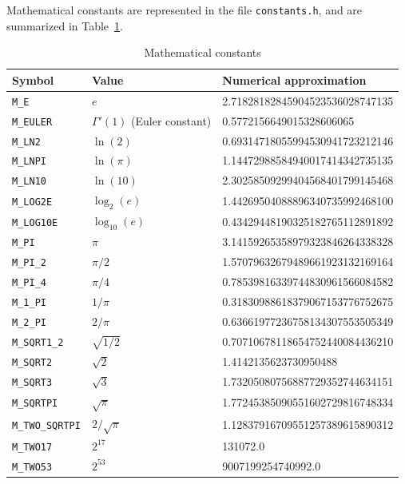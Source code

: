 Mathematical constants are represented in the file \verb|constants.h|,
and are summarized in Table~\ref{tab:constants}.
\begin{table}[htb]
\begin{small}
\begin{tabularx}{\textwidth}{lll}
Symbol & Value & Numerical approximation \\
\hline
\verb|M_E| & $e$ & 2.71828182845904523536028747135 \\
\verb|M_EULER| & $\Gamma'(1)$ (Euler constant\index{Euler constant})&
0.5772156649015328606065 \\
\verb|M_LN2| & $\ln(2)$ & 0.69314718055994530941723212146 \\
\verb|M_LNPI| & $\ln(\pi)$ & 1.14472988584940017414342735135 \\
\verb|M_LN10| & $\ln(10)$ & 2.30258509299404568401799145468 \\
\verb|M_LOG2E| & $\log_2(e)$ & 1.44269504088896340735992468100 \\
\verb|M_LOG10E| & $\log_{10} (e)$ & 0.43429448190325182765112891892 \\
\verb|M_PI| & $\pi$ & 3.14159265358979323846264338328 \\
\verb|M_PI_2| & $\pi/2$ & 1.57079632679489661923132169164 \\
\verb|M_PI_4| & $\pi/4$ & 0.78539816339744830961566084582 \\
\verb|M_1_PI| & $1/\pi$ & 0.31830988618379067153776752675 \\
\verb|M_2_PI| & $2/\pi$ & 0.63661977236758134307553505349 \\
\verb|M_SQRT1_2| & $\sqrt{1/2}$ & 0.70710678118654752440084436210 \\
\verb|M_SQRT2| & $\sqrt{2}$ & 1.4142135623730950488 \\
\verb|M_SQRT3| & $\sqrt{3}$ & 1.73205080756887729352744634151 \\
\verb|M_SQRTPI| & $\sqrt{\pi}$ & 1.77245385090551602729816748334 \\
\verb|M_TWO_SQRTPI| & $2/\sqrt{\pi}$ & 1.12837916709551257389615890312 \\
\verb|M_TWO17| & $2^{17}$ & 131072.0 \\
\verb|M_TWO53| & $2^{53}$ & 9007199254740992.0 \\
\hline
\end{tabularx}
\label{tab:constants}
\caption{Mathematical constants}
\end{small}
\end{table}

